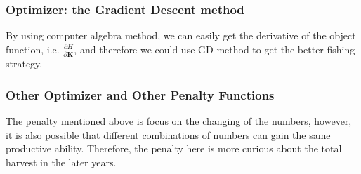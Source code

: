 \documentclass{IEEEtran}
\begin{document}
\subsubsection{Optimizer: the Gradient Descent method}

By using computer algebra method, we can easily get the derivative of the object function, i.e. $\frac{\partial H}{\partial \bm K}$, and therefore we could use GD method to get the better fishing strategy.

%
%

\subsubsection{Other Optimizer and Other Penalty Functions}

The penalty mentioned above is focus on the changing of the numbers, however, it is also possible that different combinations of numbers can gain the same productive ability. Therefore, the penalty here is more curious about the total harvest in the later years.
\end{document}
